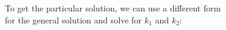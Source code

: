 \documentclass[preview]{standalone}
\begin{document}
\begin{center}
\raggedright
                To get the particular solution, we can use a different form \\
                for the general solution and solve for $k_1$ and $k_2$:
\end{center}
\end{document}
